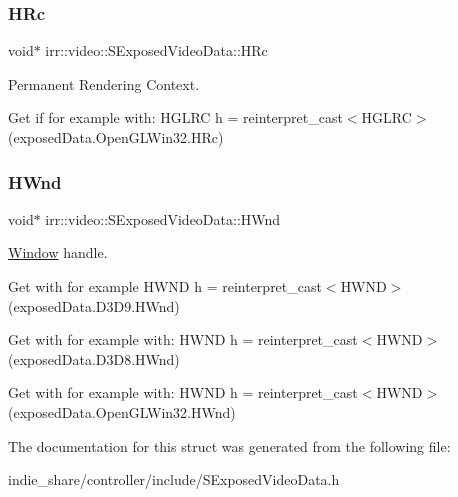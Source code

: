 \subsubsection{\texorpdfstring{H\+Rc}{HRc}}
{\footnotesize\ttfamily void$\ast$ irr\+::video\+::\+S\+Exposed\+Video\+Data\+::\+H\+Rc}



Permanent Rendering Context. 

Get if for example with\+: H\+G\+L\+RC h = reinterpret\+\_\+cast$<$\+H\+G\+L\+R\+C$>$(exposed\+Data.\+Open\+G\+L\+Win32.\+H\+Rc) \mbox{\label{structirr_1_1video_1_1SExposedVideoData_a1811289f08d71ca61b6b88b765753b88}} 
\subsubsection{\texorpdfstring{H\+Wnd}{HWnd}}
{\footnotesize\ttfamily void$\ast$ irr\+::video\+::\+S\+Exposed\+Video\+Data\+::\+H\+Wnd}



\hyperlink{classWindow}{Window} handle. 

Get with for example H\+W\+ND h = reinterpret\+\_\+cast$<$\+H\+W\+N\+D$>$(exposed\+Data.\+D3\+D9.\+H\+Wnd)

Get with for example with\+: H\+W\+ND h = reinterpret\+\_\+cast$<$\+H\+W\+N\+D$>$(exposed\+Data.\+D3\+D8.\+H\+Wnd)

Get with for example with\+: H\+W\+ND h = reinterpret\+\_\+cast$<$\+H\+W\+N\+D$>$(exposed\+Data.\+Open\+G\+L\+Win32.\+H\+Wnd) 

The documentation for this struct was generated from the following file\+:\begin{DoxyCompactItemize}
\item 
indie\+\_\+share/controller/include/S\+Exposed\+Video\+Data.\+h\end{DoxyCompactItemize}

